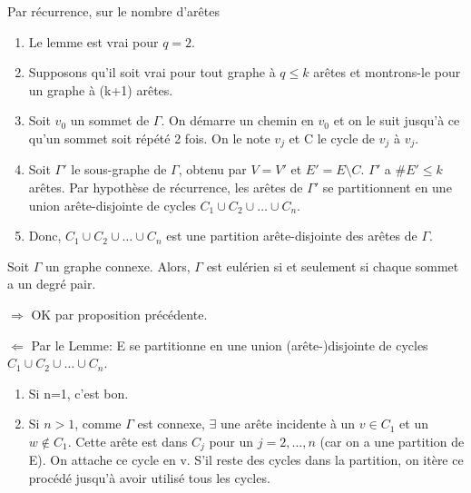 \begin{demo}
Par récurrence, sur le nombre d'arêtes
	\begin{enumerate}
		\item Le lemme est vrai pour $q=2$.
		\item Supposons qu'il soit vrai pour tout graphe à $q \leq k$ arêtes et montrons-le pour un graphe à (k+1) arêtes.
		\item Soit $v_{0}$ un sommet de $\Gamma$. On démarre un chemin en $v_{0}$ et on le suit jusqu'à ce qu'un sommet soit répété 2 fois. On le note $v_{j}$ et C le cycle de $v_{j}$ à $v_{j}$.
		\item Soit ${\Gamma}'$ le sous-graphe de $\Gamma$, obtenu par $V={V}'$ et ${E}'=E \setminus C$. ${\Gamma}'$ a $\#{E}' \leq k$ arêtes. Par hypothèse de récurrence, les arêtes de ${\Gamma}'$ se partitionnent en une union arête-disjointe de cycles $C_{1} \cup C_{2} \cup \ldots \cup C_{n}$.
		\item Donc, $C_{1} \cup C_{2} \cup \ldots \cup C_{n}$ est une partition arête-disjointe des arêtes de $\Gamma$.
	\end{enumerate}
\end{demo}

\begin{thrm}[\textcolor{red}{ATTENTION! Ce théorème et sa démonstration ainsi que le lemme et la proposition utilisés dans la démonstration font partie de ceux à connaitre par coeur à l'examen! (pour l'année 2015-2016)}]
Soit $\Gamma$ un graphe connexe. Alors, $\Gamma$ est eulérien si et seulement si chaque sommet a un degré pair.
\end{thrm}

\begin{demo}
$\Rightarrow$ OK par proposition précédente.

\hspace{-0.60cm}$\Leftarrow$ Par le Lemme: E se partitionne en une union (arête-)disjointe de cycles $C_{1} \cup C_{2} \cup \ldots \cup C_{n}$.
	\begin{enumerate}
		\item Si n=1, c'est bon.
		\item Si $n>1$, comme $\Gamma$ est connexe, $\exists$ une arête incidente à un $v \in C_{1}$ et un $w \notin C_{1}$. Cette arête est dans $C_{j}$ pour un $j=2,\ldots,n$ (car on a une partition de E). On attache ce cycle en v. S'il reste des cycles dans la partition, on itère ce procédé jusqu'à avoir utilisé tous les cycles.
	\end{enumerate}
\end{demo}

